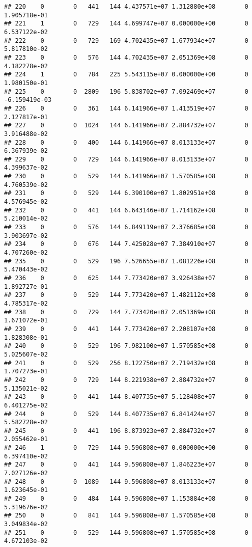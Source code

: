 \documentclass[
]{article}
\begin{document}
\begin{enumerate}
\begin{verbatim}
## 220    0        0   441   144 4.437571e+07 1.312880e+08        0  1.905718e-01
## 221    1        0   729   144 4.699747e+07 0.000000e+00        0  6.537122e-02
## 222    0        0   729   169 4.702435e+07 1.677934e+07        0  5.817810e-02
## 223    0        0   576   144 4.702435e+07 2.051369e+08        0  4.182278e-02
## 224    1        0   784   225 5.543115e+07 0.000000e+00        0  1.980150e-01
## 225    0        0  2809   196 5.838702e+07 7.092469e+07        0 -6.159419e-03
## 226    0        0   361   144 6.141966e+07 1.413519e+07        0  2.127817e-01
## 227    0        0  1024   144 6.141966e+07 2.884732e+07        0  3.916488e-02
## 228    0        0   400   144 6.141966e+07 8.013133e+07        0  6.367939e-02
## 229    0        0   729   144 6.141966e+07 8.013133e+07        0  4.399637e-02
## 230    0        0   529   144 6.141966e+07 1.570585e+08        0  4.760539e-02
## 231    0        0   529   144 6.390100e+07 1.802951e+08        0  4.576945e-02
## 232    0        0   441   144 6.643146e+07 1.714162e+08        0  5.210014e-02
## 233    0        0   576   144 6.849119e+07 2.376685e+08        0  3.903697e-02
## 234    0        0   676   144 7.425028e+07 7.384910e+07        0  4.707260e-02
## 235    0        0   529   196 7.526655e+07 1.081226e+08        0  5.470443e-02
## 236    0        0   625   144 7.773420e+07 3.926438e+07        0  1.892727e-01
## 237    0        0   529   144 7.773420e+07 1.482112e+08        0  4.785317e-02
## 238    0        0   729   144 7.773420e+07 2.051369e+08        0  1.671072e-01
## 239    0        0   441   144 7.773420e+07 2.208107e+08        0  1.828308e-01
## 240    0        0   529   196 7.982100e+07 1.570585e+08        0  5.025607e-02
## 241    0        0   529   256 8.122750e+07 2.719432e+08        0  1.707273e-01
## 242    0        0   729   144 8.221938e+07 2.884732e+07        0  5.135021e-02
## 243    0        0   441   144 8.407735e+07 5.128408e+07        0  6.401275e-02
## 244    0        0   529   144 8.407735e+07 6.841424e+07        0  5.582728e-02
## 245    0        0   441   196 8.873923e+07 2.884732e+07        0  2.055462e-01
## 246    1        0   729   144 9.596808e+07 0.000000e+00        0  6.397410e-02
## 247    0        0   441   144 9.596808e+07 1.846223e+07        0  7.027126e-02
## 248    0        0  1089   144 9.596808e+07 8.013133e+07        0  1.623645e-01
## 249    0        0   484   144 9.596808e+07 1.153884e+08        0  5.319676e-02
## 250    0        0   841   144 9.596808e+07 1.570585e+08        0  3.049834e-02
## 251    0        0   529   144 9.596808e+07 1.570585e+08        0  4.672103e-02

\end{verbatim}
\end{enumerate}
\end{document}
